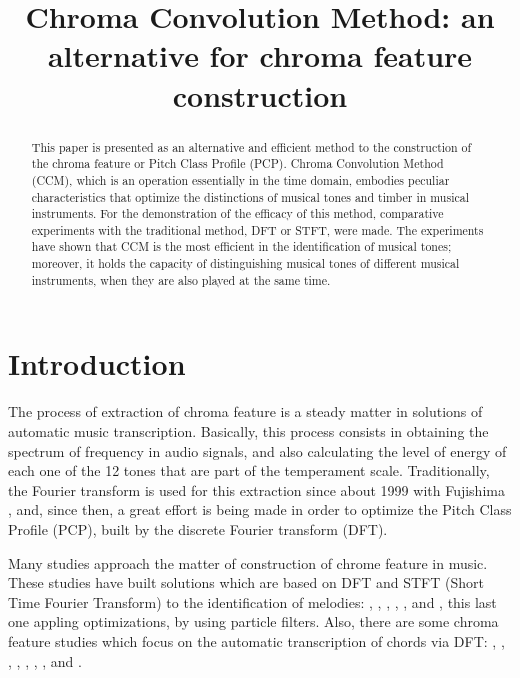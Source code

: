 \documentclass{article}
\title{Chroma Convolution Method: an alternative for chroma feature construction}
\begin{document}
%
\maketitle
%
\begin{abstract}

This paper is presented as an alternative and efficient method to the construction of the chroma feature or Pitch Class Profile (PCP). Chroma Convolution Method (CCM), which is an operation essentially in the time domain, embodies peculiar characteristics that optimize the distinctions of musical tones and timber in musical instruments. For the demonstration of the efficacy of this method, comparative experiments with the traditional method, DFT or STFT,  were made. The experiments have shown that CCM is the most efficient in the identification of musical tones; moreover, it holds the capacity of distinguishing musical tones of different musical instruments, when they are also played at the same time.
\end{abstract}
%
\section{Introduction}\label{sec:introduction}


	The process of extraction of chroma feature is a steady matter in solutions of automatic music transcription. Basically, this process consists in obtaining the spectrum of frequency in audio signals, and also calculating the level of energy of each one of the 12 tones that are part of the temperament scale. Traditionally, the Fourier transform is used for this extraction since about 1999 with Fujishima \cite{fujishima1999realtime}, and, since then, a great effort is being made in order to optimize the Pitch Class Profile (PCP), built by the discrete Fourier transform (DFT).

	Many studies approach the matter of construction of chrome feature in music. These studies have built solutions which are based on DFT and STFT (Short Time Fourier Transform) to the identification of melodies: \cite{muto2002transcription}, \cite{al2008time}, \cite{barbancho2009transcription}, \cite{gomez2004automatic}, \cite{tangmelody}, \cite{eggink2004extracting} and \cite{jo2010melody}, this last one appling optimizations, by using particle filters. Also, there are some chroma feature studies which focus on the automatic transcription of chords via DFT:
	\cite{harte2009automatic}, \cite{khadkevich2011time}, \cite{harte2010towards}, \cite{peeters2006chroma}, \cite{cho2010exploring} \cite{lee2006automatic}, \cite{de2012improving}, \cite{boulanger2013audio}, \cite{chen2012chord} and \cite{hrybyk2010combined}.
\end{document}
